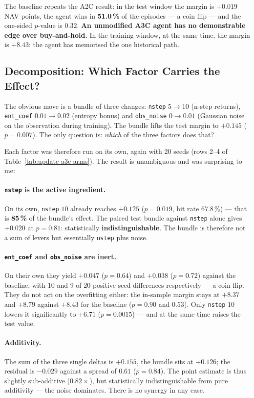 The baseline repeats the A2C result: in the test window the margin is $+0.019$ NAV points,
the agent wins in \textbf{51.0\,\%} of the episodes --- a coin flip --- and the one-sided
$p$-value is $0.32$. \textbf{An unmodified A3C agent has no demonstrable edge over
buy-and-hold.} In the training window, at the same time, the margin is $+8.43$: the agent
has memorised the one historical path.

\subsection{Decomposition: Which Factor Carries the Effect?}

The obvious move is a bundle of three changes: \texttt{nstep} $5\to10$ (n-step returns),
\texttt{ent\_coef} $0.01\to0.02$ (entropy bonus) and \texttt{obs\_noise} $0\to0.01$
(Gaussian noise on the observation during training). The bundle lifts the test margin to
$+0.145$ ($p=0.007$). The only question is: \emph{which} of the three factors does that?

Each factor was therefore run on its own, again with 20 seeds (rows 2--4 of
Table~\ref{tab:update-a3c-arms}). The result is unambiguous and was surprising to me:

\paragraph{\texttt{nstep} is the active ingredient.} On its own, \texttt{nstep} $10$
already reaches $+0.125$ ($p=0.019$, hit rate 67.8\,\%) --- that is \textbf{85\,\%} of the
bundle's effect. The paired test bundle against \texttt{nstep} alone gives $+0.020$ at
$p=0.81$: statistically \textbf{indistinguishable}. The bundle is therefore not a sum of
levers but essentially \texttt{nstep} plus noise.

\paragraph{\texttt{ent\_coef} and \texttt{obs\_noise} are inert.} On their own they yield
$+0.047$ ($p=0.64$) and $+0.038$ ($p=0.72$) against the baseline, with 10 and 9 of 20
positive seed differences respectively --- a coin flip. They do not act on the overfitting
either: the in-sample margin stays at $+8.37$ and $+8.79$ against $+8.43$ for the baseline
($p=0.90$ and $0.53$). Only \texttt{nstep} $10$ lowers it significantly to $+6.71$
($p=0.0015$) --- and at the same time raises the test value.

\paragraph{Additivity.} The sum of the three single deltas is $+0.155$, the bundle sits at
$+0.126$; the residual is $-0.029$ against a spread of $0.61$ ($p=0.84$). The point
estimate is thus slightly sub-additive ($0.82\times$), but statistically indistinguishable
from pure additivity --- the noise dominates. There is no synergy in any case.

